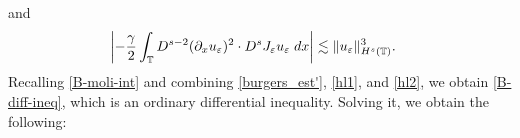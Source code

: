 %
%
%
%
%
%
and 
%
%
\begin{equation}
\label{hl2}
\begin{split}
\left | - \frac{\gamma}{2} \int_{\mathbb{T}} D^{s-2} (\partial_x u_\varepsilon)^2 \cdot
D^s J_\varepsilon u_\varepsilon \; dx \right |
& \lesssim \|u_\varepsilon\|_{H^s(\mathbb{T})}^3.
\end{split}
\end{equation}
%
%
%
Recalling \eqref{B-moli-int} and combining \eqref{burgers_est'}, 
\eqref{hl1}, and \eqref{hl2}, we obtain
\eqref{B-diff-ineq}, which is an ordinary differential inequality. Solving  
it, we obtain the following:

%  
% 
%
%
%   
%
